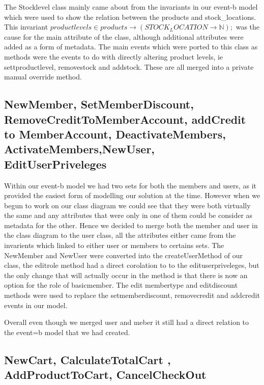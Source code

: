 \documentclass[a4paper]{article}
\begin{document}
The Stocklevel class mainly came about from the invariants in our event-b model which were used to show the relation between the products and stock\_locations. This invariant \(productlevels ∈ products →(STOCK_LOCATION → ℕ); \)  was the cause for the main attribute of the class, although additional attributes were added as a form of metadata. The main events which were ported to this class as methods were the events to do with directly altering product levels, ie settproductlevel, removestock and addstock. These are all merged into a private manual override method.

\subsection{NewMember, SetMemberDiscount, RemoveCreditToMemberAccount, addCredit to MemberAccount, DeactivateMembers, ActivateMembers,NewUser, EditUserPriveleges}

Within our event-b model we had two sets for both the members and users, as it provided the easiest form of modelling our solution at the time. However when we begun to work on our class diagram we could see that they were both virtually the same and any attributes that were only in one of them could be consider as metadata for the other. Hence we decided to merge both the member and user in the class diagram to the user class, all the attributes either came from the invarients which linked to either user or members to certains sets. The NewMember and NewUser were converted into the createUserMethod of our class, the editrole method had a direct corolation to to the edituserpriveleges, but the only change that will actually occur in the method is that there is now an option for the role of basicmember. The edit membertype and editdiscount methods were used to replace the setmemberdiscount, removecredit and addcredit events in our model. 

Overall even though we merged user and meber it still had a direct relation to the event=b model that we had created. 


\subsection{NewCart, CalculateTotalCart , AddProductToCart, CancelCheckOut}
\end{document}
